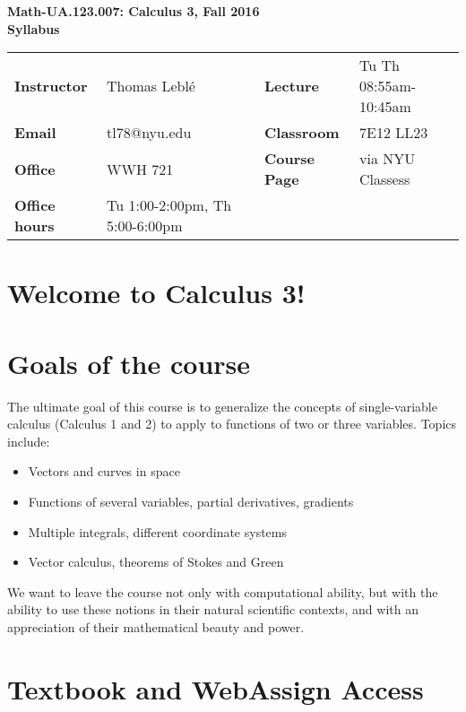 \documentclass[10pt]{article}
\theoremstyle{definition}
\begin{document}
%
\thispagestyle{empty}
\begin{center}
\textbf{\Large
Math-UA.123.007: Calculus 3, Fall 2016 \\
Syllabus}
\end{center}

\vspace{0.5cm}

\noindent
\begin{tabular}{l l p{2cm} l l}
\textbf{Instructor} & Thomas Lebl\'{e} 	& & \textbf{Lecture} & Tu Th 08:55am-10:45am\\
\textbf{Email} & tl78@nyu.edu 	& & \textbf{Classroom} & 7E12 LL23\\
\textbf{Office} & WWH 721 		& & \textbf{Course Page} & via NYU Classess\\
\textbf{Office hours} & Tu 1:00-2:00pm, Th 5:00-6:00pm
\end{tabular}

\section*{Welcome to Calculus 3!}

\section*{Goals of the course}

The ultimate goal of this course is to generalize the concepts of single-variable calculus (Calculus 1 and 2) to apply to functions of two or three variables.  Topics include:
\begin{itemize}
\item Vectors and curves in space
\item Functions of several variables, partial derivatives, gradients
\item Multiple integrals, different coordinate systems
\item Vector calculus, theorems of Stokes and Green
\end{itemize}
We want to leave the course not only with computational ability, but with the ability to use these notions in their natural scientific contexts, and with an appreciation of their mathematical beauty and power.

\section*{Textbook and WebAssign Access}
\end{document}
